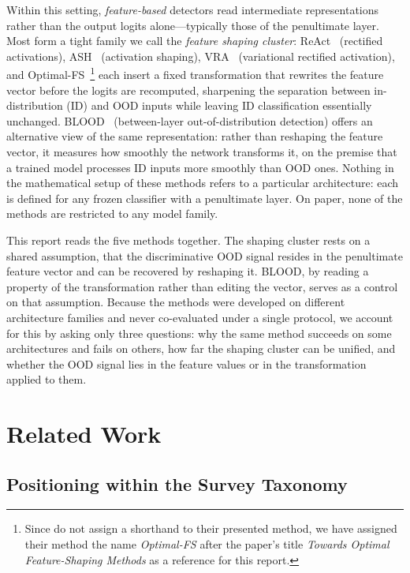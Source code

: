 \documentclass[a4paper]{article}
\begin{document}
Within this setting, \emph{feature-based} detectors read intermediate
representations rather than the output logits alone---typically those of the penultimate layer.
Most form a tight family we call the \emph{feature shaping cluster}: ReAct~\citep{react} (rectified activations),
ASH~\citep{ash} (activation shaping), VRA~\citep{vra} (variational rectified
activation), and Optimal-FS~\citep{optimalfs}\footnote{Since \citet{optimalfs} do not assign a shorthand to their presented method, we have assigned their method the name \emph{Optimal-FS} after the paper's title \emph{Towards Optimal Feature-Shaping Methods} as a reference for this report.} each insert a fixed transformation that rewrites the feature
vector before the logits are recomputed, sharpening the separation between
in-distribution (ID) and OOD inputs while leaving ID classification essentially
unchanged. BLOOD~\citep{blood} (between-layer out-of-distribution detection) offers an
alternative view of the same representation: rather than reshaping the feature vector,
it measures how smoothly the network transforms it, on the premise that a trained model
processes ID inputs more smoothly than OOD ones. Nothing in the mathematical setup of
these methods refers to a particular architecture: each is defined for any frozen
classifier with a penultimate layer. On paper, none of the methods are restricted to any model family.

This report reads the five methods together. The shaping cluster rests on a shared
assumption, that the discriminative OOD signal resides in the penultimate feature
vector and can be recovered by reshaping it. BLOOD, by reading a property of the
transformation rather than editing the vector, serves as a control on that assumption.
Because the methods were developed on different architecture families and never
co-evaluated under a single protocol, we account for this by asking only three questions: why the same method succeeds
on some architectures and fails on others, how far the shaping cluster can be unified,
and whether the OOD signal lies in the feature values or in the transformation applied
to them.

\section{Related Work}
\label{related}


\subsection{Positioning within the Survey Taxonomy}
\label{subsec:taxonomy}
\end{document}
